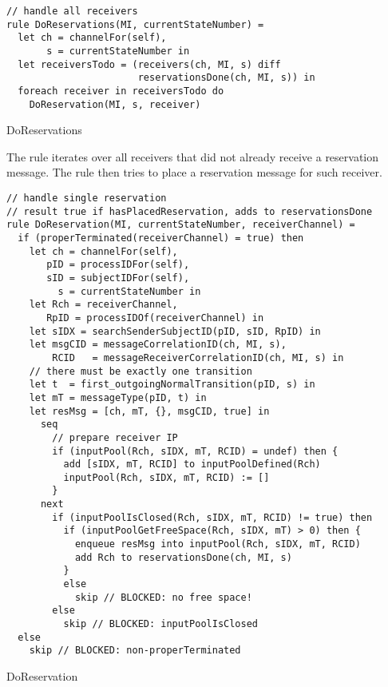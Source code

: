 \begin{listing}[H]
\begin{verbatim}
// handle all receivers
rule DoReservations(MI, currentStateNumber) =
  let ch = channelFor(self),
       s = currentStateNumber in
  let receiversTodo = (receivers(ch, MI, s) diff
                       reservationsDone(ch, MI, s)) in
  foreach receiver in receiversTodo do
    DoReservation(MI, s, receiver)
\end{verbatim}
\caption{DoReservations}
\label{lst:shortasm:DoReservations}
\end{listing}



The  rule iterates over all receivers that did not
already receive a reservation message. The  rule
then tries to place a reservation message for such receiver.

\begin{listing}[H]
\begin{verbatim}
// handle single reservation
// result true if hasPlacedReservation, adds to reservationsDone
rule DoReservation(MI, currentStateNumber, receiverChannel) =
  if (properTerminated(receiverChannel) = true) then
    let ch = channelFor(self),
       pID = processIDFor(self),
       sID = subjectIDFor(self),
         s = currentStateNumber in
    let Rch = receiverChannel,
       RpID = processIDOf(receiverChannel) in
    let sIDX = searchSenderSubjectID(pID, sID, RpID) in
    let msgCID = messageCorrelationID(ch, MI, s),
        RCID   = messageReceiverCorrelationID(ch, MI, s) in
    // there must be exactly one transition
    let t  = first_outgoingNormalTransition(pID, s) in
    let mT = messageType(pID, t) in
    let resMsg = [ch, mT, {}, msgCID, true] in
      seq
        // prepare receiver IP
        if (inputPool(Rch, sIDX, mT, RCID) = undef) then {
          add [sIDX, mT, RCID] to inputPoolDefined(Rch)
          inputPool(Rch, sIDX, mT, RCID) := []
        }
      next
        if (inputPoolIsClosed(Rch, sIDX, mT, RCID) != true) then
          if (inputPoolGetFreeSpace(Rch, sIDX, mT) > 0) then {
            enqueue resMsg into inputPool(Rch, sIDX, mT, RCID)
            add Rch to reservationsDone(ch, MI, s)
          }
          else
            skip // BLOCKED: no free space!
        else
          skip // BLOCKED: inputPoolIsClosed
  else
    skip // BLOCKED: non-properTerminated
\end{verbatim}
\caption{DoReservation}
\label{lst:shortasm:DoReservation}
\end{listing}


